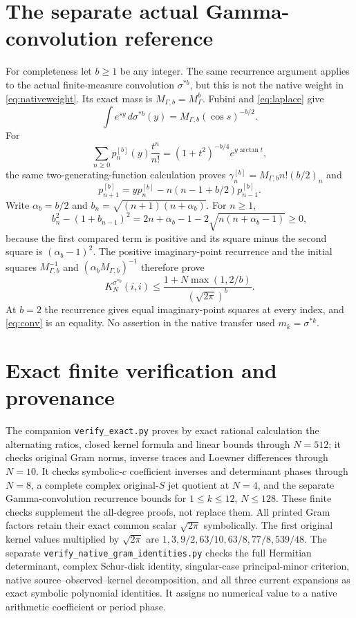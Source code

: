 \documentclass[11pt]{article}
\begin{document}
\section{The separate actual Gamma-convolution reference}

For completeness let $b\ge1$ be any integer.  The same recurrence
argument applies to the actual finite-measure convolution $\sigma^{*b}$,
but this is not the native weight in \eqref{eq:nativeweight}.  Its exact
mass is $M_{\Gamma,b}=M_\Gamma^b$.  Fubini and \eqref{eq:laplace} give
\[
 \int e^{sy}\,d\sigma^{*b}(y)=M_{\Gamma,b}(\cos s)^{-b/2}.
\]
For
\[
 \sum_{n\ge0}p_n^{[b]}(y)\frac{t^n}{n!}
 =(1+t^2)^{-b/4}e^{y\arctan t},
\]
the same two-generating-function calculation proves
$\gamma_n^{[b]}=M_{\Gamma,b}n!(b/2)_n$ and
\[
 p_{n+1}^{[b]}=yp_n^{[b]}-n(n-1+b/2)p_{n-1}^{[b]}.
\]
Write $\alpha_b=b/2$ and $b_n=\sqrt{(n+1)(n+\alpha_b)}$.
For $n\ge1$,
\[
 b_n^2-(1+b_{n-1})^2
 =2n+\alpha_b-1-2\sqrt{n(n+\alpha_b-1)}\ge0,
\]
because the first compared term is positive and its square minus the
second square is $(\alpha_b-1)^2$.  The positive imaginary-point
recurrence and the initial squares $M_{\Gamma,b}^{-1}$ and
$(\alpha_bM_{\Gamma,b})^{-1}$ therefore prove
\begin{equation}\label{eq:conv}
 K_N^{\sigma^{*b}}(i,i)
 \le\frac{1+N\max(1,2/b)}{(\sqrt{2\pi})^b}.
\end{equation}
At $b=2$ the recurrence gives equal imaginary-point squares at every
index, and \eqref{eq:conv} is an equality.  No assertion in the native
transfer used $m_k=\sigma^{*k}$.

\section{Exact finite verification and provenance}

The companion \texttt{verify\_exact.py} proves by exact rational
calculation the alternating ratios, closed kernel formula and linear
bounds through $N=512$; it checks original Gram norms, inverse traces
and Loewner differences through $N=10$.  It checks symbolic-$c$
coefficient inverses and determinant phases through $N=8$, a complete
complex original-$S$ jet quotient at $N=4$, and the separate
Gamma-convolution recurrence bounds for $1\le k\le12$, $N\le128$.
These finite checks supplement the all-degree proofs, not replace them.
All printed Gram factors retain their exact common scalar
$\sqrt{2\pi}$ symbolically.  The first original kernel values multiplied
by $\sqrt{2\pi}$ are $1,3,9/2,63/10,63/8,77/8,539/48$.
The separate \texttt{verify\_native\_gram\_identities.py} checks the full
Hermitian determinant, complex Schur-disk identity, singular-case
principal-minor criterion, native source--observed--kernel decomposition,
and all three current expansions as exact symbolic polynomial identities.
It assigns no numerical value to a native arithmetic coefficient or
period phase.
\end{document}
